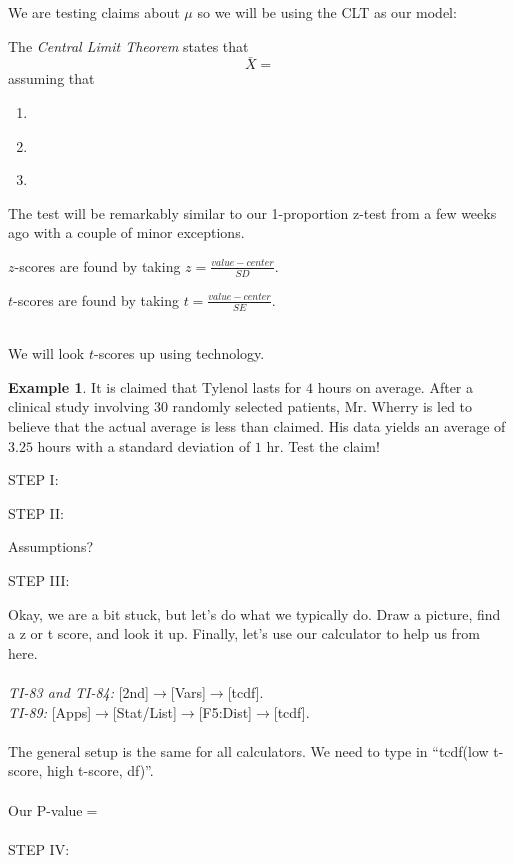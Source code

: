 \documentclass[12pt]{amsart}
\theoremstyle{definition}
\newtheorem{ex}{Example}
\begin{document}
 We are testing claims about $\mu$ so we will be using the CLT as our model:
 \begin{framed}
 The \emph{Central Limit Theorem} states that $$\bar{X}=$$ assuming that
 \begin{enumerate}
  \item \,
  \item \,
  \item \,
 \end{enumerate}
 \end{framed}

 The test will be remarkably similar to our 1-proportion z-test from a few weeks ago with a couple of minor exceptions.
 \begin{framed}
  $z$-scores are found by taking $z=\frac{value-center}{SD}$.
  
  $t$-scores are found by taking $t=\frac{value-center}{SE}$.
 \end{framed}
 ~\\
 We will look $t$-scores up using technology.
 \newpage
\begin{ex}
 It is claimed that Tylenol lasts for $4$ hours on average. After a clinical study involving $30$ randomly selected patients, Mr. Wherry is led to believe that the actual average is less than claimed. His data yields an average of $3.25$ hours with a standard deviation of $1$ hr. Test the claim!
\end{ex}
\noindent STEP I:
\vspace{0.5in}

\noindent STEP II:
\vspace{1.5in}

Assumptions?
\vspace{1in}

\noindent STEP III:
\vspace{2in}

Okay, we are a bit stuck, but let's do what we typically do. Draw a picture, find a z or t score, and look it up. Finally, let's use our calculator to help us from here.\\
~\\
\emph{TI-83 and TI-84:} [2nd]$\rightarrow$[Vars]$\rightarrow$[tcdf].\\
\emph{TI-89:} [Apps]$\rightarrow$[Stat/List]$\rightarrow$[F5:Dist]$\rightarrow$[tcdf].\\
~\\
The general setup is the same for all calculators. We need to type in ``tcdf(low t-score, high t-score, df)''.\\
~\\
Our P-value$=$\underline{\hspace{5in}}\\
~\\
\noindent STEP IV:
\end{document}
